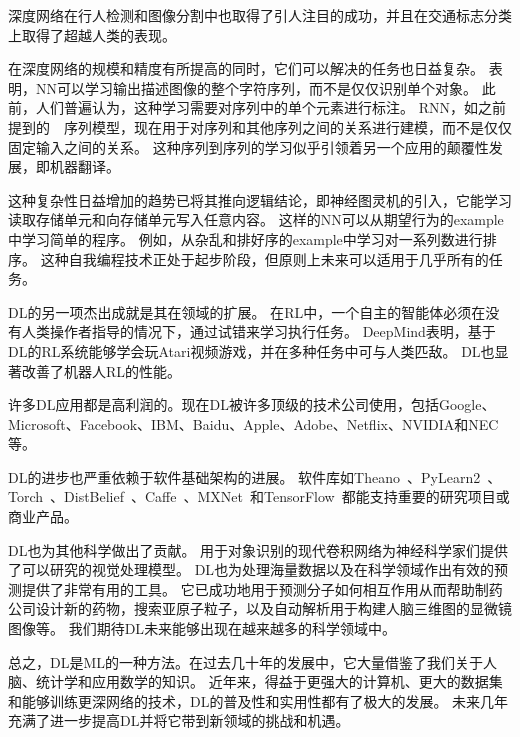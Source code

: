 深度网络在行人检测和图像分割中也取得了引人注目的成功\citep{sermanet-cvpr-13,Farabet-et-al-2013,couprie-iclr-13}，并且在交通标志分类上取得了超越人类的表现\citep{Ciresan-et-al-2012}。

在深度网络的规模和精度有所提高的同时，它们可以解决的任务也日益复杂。
\citet{Goodfellow+et+al-ICLR2014a}表明，\gls{NN}可以学习输出描述图像的整个字符序列，而不是仅仅识别单个对象。
此前，人们普遍认为，这种学习需要对序列中的单个元素进行标注\citep{Gulcehre+Bengio-arxiv-2013}。
\gls{RNN}，如之前提到的~~序列模型，现在用于对序列和其他序列之间的关系进行建模，而不是仅仅固定输入之间的关系。
这种序列到序列的学习似乎引领着另一个应用的颠覆性发展，即机器翻译\citep{Sutskever-et-al-NIPS2014,Bahdanau-et-al-ICLR2015-small}。


这种复杂性日益增加的趋势已将其推向逻辑结论，即神经图灵机\citep{Graves-et-al-arxiv2014}的引入，它能学习读取存储单元和向存储单元写入任意内容。
这样的\gls{NN}可以从期望行为的\gls{example}中学习简单的程序。
例如，从杂乱和排好序的\gls{example}中学习对一系列数进行排序。
这种自我编程技术正处于起步阶段，但原则上未来可以适用于几乎所有的任务。


\gls{DL}的另一项杰出成就是其在领域的扩展。
在\gls{RL}中，一个自主的智能体必须在没有人类操作者指导的情况下，通过试错来学习执行任务。
DeepMind表明，基于\gls{DL}的\gls{RL}系统能够学会玩Atari视频游戏，并在多种任务中可与人类匹敌\citep{Mnih-et-al-2015}。
\gls{DL}也显著改善了机器人\gls{RL}的性能\citep{finn2015learning}。

许多\gls{DL}应用都是高利润的。现在\gls{DL}被许多顶级的技术公司使用，包括Google、Microsoft、Facebook、IBM、Baidu、Apple、Adobe、Netflix、NVIDIA和NEC等。

\gls{DL}的进步也严重依赖于软件基础架构的进展。
软件库如Theano~\citep{bergstra+al:2010-scipy,Bastien-2012}、PyLearn2~\citep{pylearn2_arxiv_2013}、Torch~\citep{Torch-2011}、DistBelief~\citep{Dean-et-al-NIPS2012}、Caffe~\citep{Jia13caffe}、MXNet~\citep{chen2015mxnet}和TensorFlow~\citep{tensorflow}都能支持重要的研究项目或商业产品。

\gls{DL}也为其他科学做出了贡献。
用于对象识别的现代卷积网络为神经科学家们提供了可以研究的视觉处理模型\citep{dicarlo-tutorial-2013}。
\gls{DL}也为处理海量数据以及在科学领域作出有效的预测提供了非常有用的工具。
它已成功地用于预测分子如何相互作用从而帮助制药公司设计新的药物\citep{Dahl-et-al-arxiv2014}，搜索亚原子粒子\citep{baldi2014searching}，以及自动解析用于构建人脑三维图的显微镜图像\citep{knowlesdeep}等。
我们期待\gls{DL}未来能够出现在越来越多的科学领域中。


总之，\gls{DL}是\gls{ML}的一种方法。在过去几十年的发展中，它大量借鉴了我们关于人脑、统计学和应用数学的知识。
近年来，得益于更强大的计算机、更大的数据集和能够训练更深网络的技术，\gls{DL}的普及性和实用性都有了极大的发展。
未来几年充满了进一步提高\gls{DL}并将它带到新领域的挑战和机遇。

